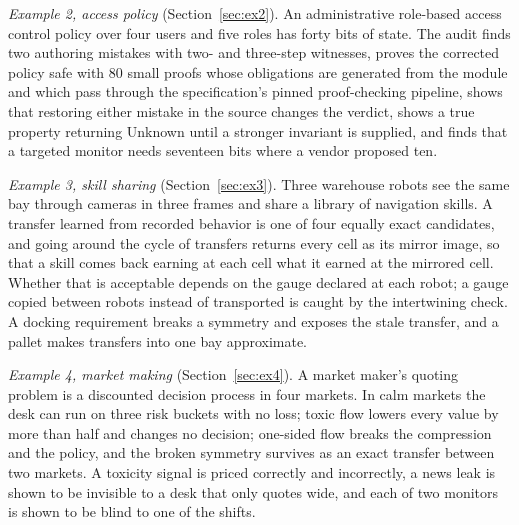 \documentclass[11pt]{article}
\theoremstyle{definition}
\theoremstyle{plain}
\begin{document}
\emph{Example 2, access policy} (Section~\ref{sec:ex2}). An administrative role-based access
control policy over four users and five roles has forty bits of state. The audit finds two
authoring mistakes with two- and three-step witnesses, proves the corrected policy safe with
$80$ small proofs whose obligations are generated from the module and which pass through the
specification's pinned proof-checking pipeline, shows that restoring either mistake in the source
changes the verdict, shows a true property returning Unknown until a stronger invariant is
supplied, and finds that a targeted monitor needs seventeen bits where a vendor proposed ten.

\emph{Example 3, skill sharing} (Section~\ref{sec:ex3}). Three warehouse robots see the same bay
through cameras in three frames and share a library of navigation skills. A transfer learned from
recorded behavior is one of four equally exact candidates, and going around the cycle of transfers
returns every cell as its mirror image, so that a skill comes back earning at each cell what it
earned at the mirrored cell. Whether that is acceptable depends on the gauge declared
at each robot; a gauge copied between robots instead of transported is caught by the intertwining
check. A docking requirement breaks a symmetry and exposes the stale transfer, and a pallet makes
transfers into one bay approximate.

\emph{Example 4, market making} (Section~\ref{sec:ex4}). A market maker's quoting problem is a
discounted decision process in four markets. In calm markets the desk can run on three risk
buckets with no loss; toxic flow lowers every value by more than half and changes no decision;
one-sided flow breaks the compression and the policy, and the broken symmetry survives as an exact
transfer between two markets. A toxicity signal is priced correctly and incorrectly, a news leak
is shown to be invisible to a desk that only quotes wide, and each of two monitors is shown to be
blind to one of the shifts.
\end{document}
